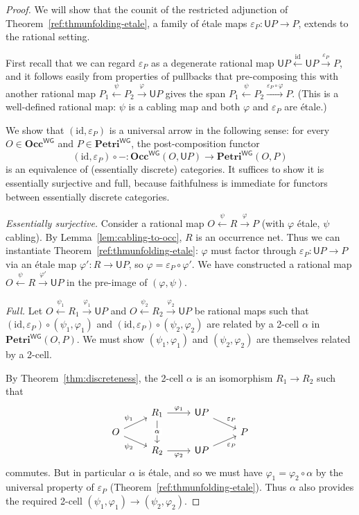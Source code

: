 \documentclass[11pt,a4paper]{article}
\theoremstyle{plain}
\theoremstyle{definition}
\theoremstyle{remark}
\newcommand{\WGPetri}{\mathbf{Petri}^{\mathsf{WG}}}
\newcommand{\WGOcc}{\mathbf{Occ}^{\mathsf{WG}}}
\newcommand{\U}{\mathsf{U}}
\newcommand{\id}{\mathrm{id}}
\begin{document}
\begin{proof}
We will show that the counit of the restricted adjunction of Theorem~\ref{ref:thmunfolding-etale}, a family of \'etale maps $\varepsilon_P : \U P \to P$, extends to the rational setting. 

First recall that we can regard $\varepsilon_P$ as a degenerate rational map
 $\U P \xleftarrow{\id} \U P \xrightarrow{\varepsilon_P} P$, and it follows easily from properties of pullbacks that pre-composing this with another rational map $P_1 \xleftarrow{\psi} P_2 \xrightarrow{\varphi} \U P$ gives the span $P_1 \xleftarrow{\psi} P_2 \xrightarrow{\varepsilon_P \circ \varphi} P$. (This is a well-defined rational map: $\psi$ is a cabling map and both $\varphi$ and $\varepsilon_P$ are \'etale.)

We show that $(\id, \varepsilon_P)$ is a universal arrow in the following sense: for every $O \in \WGOcc$ and $P \in \WGPetri$, the post-composition functor 
\[
(\id, \varepsilon_P) \circ - : \WGOcc(O, \U P) \longrightarrow \WGPetri(O, P)
\]
is an equivalence of (essentially discrete) categories. It suffices to show it is essentially surjective and full, because faithfulness is immediate for functors between essentially discrete categories.

\emph{Essentially surjective.} Consider a rational map $O \xleftarrow{\psi} R \xrightarrow{\varphi} P$ (with $\varphi$ \'etale, $\psi$ cabling). By Lemma~\ref{lem:cabling-to-occ}, $R$ is an occurrence net. Thus we can instantiate Theorem~\ref{ref:thmunfolding-etale}: $\varphi$ must factor through $\varepsilon_P : \U P\to P$ via an \'etale map $\varphi' : R \to \U P$, so $\varphi = \varepsilon_P \circ \varphi'$. We have constructed a rational map $O \xleftarrow{\psi} R \xrightarrow{\varphi'} \U P$ in the pre-image of $(\varphi, \psi)$. 

\emph{Full.} Let $O \xleftarrow{\psi_1} R_1 \xrightarrow{\varphi_1} \U P$ and $O \xleftarrow{\psi_2} R_2 \xrightarrow{\varphi_2} \U P$ be rational maps such that $(\id, \varepsilon_P) \circ (\psi_1, \varphi_1)$ and $(\id, \varepsilon_P) \circ (\psi_2, \varphi_2)$ are related by a 2-cell $\alpha$ in $\WGPetri(O, P)$. We must show $(\psi_1, \varphi_1)$ and $(\psi_2, \varphi_2)$ are themselves related by a 2-cell. 

By Theorem~\ref{thm:discreteness}, the 2-cell $\alpha$ is an isomorphism $R_1 \to R_2$ such that
\[\begin{tikzcd}[row sep=tiny]
	& {R_1} & {\U P} & \\
	O &&& P \\
	& {R_2} & {\U P}
	\arrow["{\varphi_1}", from=1-2, to=1-3]
	\arrow["\alpha"{description}, from=1-2, to=3-2]
	\arrow["{\varepsilon_P}", from=1-3, to=2-4]
	\arrow["{\psi_1}", from=2-1, to=1-2]
	\arrow["{\psi_2}"', from=2-1, to=3-2]
	\arrow["{\varphi_2}"', from=3-2, to=3-3]
	\arrow["{\varepsilon_P}"', from=3-3, to=2-4]
\end{tikzcd}\]
commutes. But in particular $\alpha$ is \'etale, and so we must have $\varphi_1 = \varphi_2 \circ \alpha$ by the universal property of $\varepsilon_P$ (Theorem~\ref{ref:thmunfolding-etale}). Thus $\alpha$ also provides the required 2-cell $(\psi_1, \varphi_1) \to (\psi_2, \varphi_2)$.
\end{proof}
\end{document}
